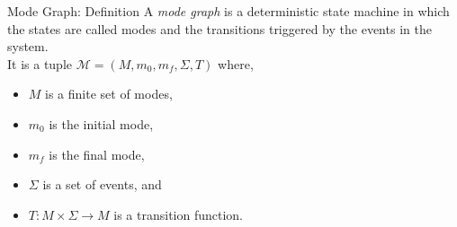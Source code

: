 \documentclass[10pt]{beamer}
\theoremstyle{plain}
\theoremstyle{definition}
\begin{document}
\begin{frame}{Mode Graph: Definition}
A \emph{mode graph} is a deterministic state machine in which the states are called modes and the transitions triggered by the events in the system. \\
It is a tuple $\mathcal{M} = (M, m_0, m_f, \Sigma, T)$ where,
\begin{itemize}
	\item $M$ is a finite set of modes,
	\item $m_0$ is the initial mode, 
	\item $m_f$ is the final mode, 
	\item $\Sigma$ is a set of events, and 
	\item $T: M\times \Sigma \rightarrow M$ is a
	transition function.
\end{itemize}
\end{frame}
\end{document}
